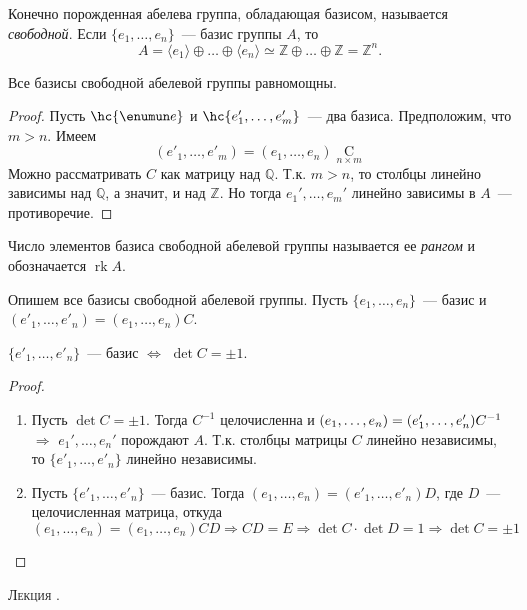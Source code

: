 \documentclass[a4paper]{article}
\newcounter{lec}
\renewcommand{\thelec}{\Roman{lec}}
\newcommand*{\lecture}[1]{\refstepcounter{lec}\vspace{20pt}
\begin{center}{\rmfamily\textsc{Лекция \thelec. \\ \textbf{#1}}}\vspace{5pt}
\end{center}}
\renewcommand{\rk}{\mathop{\mathrm{rk}}\nolimits}
\newcommand*{\p}[1]{#1\nobreak\discretionary{}{\hbox{$\mathsurround=0pt #1$}}{}}
\begin{document}
Конечно порожденная абелева группа, обладающая базисом, называется
\emph{свободной}. Если $\{e_1,\ldots,e_n\}$~--- базис группы $A$, то
$$A=\langle e_1\rangle\oplus\ldots\oplus\langle e_n\rangle\simeq
\mathbb{Z}\oplus\ldots\oplus\mathbb{Z}=\mathbb{Z}^n.$$

\begin{theorem}
Все базисы свободной абелевой группы равномощны.
\end{theorem}

\begin{proof}
Пусть $\hc{\enumun e}$ и $\hc{e'_1,\ldots,e'_m}$~--- два базиса.
Предположим, что $m>n$. Имеем
$$(e'_1,\ldots,e'_m)=(e_1,\ldots,e_n)\mathop{C}\limits_{n\times m}$$
Можно рассматривать $C$ как матрицу над $\mathbb{Q}$. Т.к. $m>n$, то
столбцы линейно зависимы над $\mathbb{Q}$, а значит, и над
$\mathbb{Z}$. Но тогда $e_1',\ldots,e_m'$ линейно зависимы в $A$~---
противоречие.
\end{proof}

Число элементов базиса свободной абелевой группы называется ее
\emph{рангом} и обозначается $\rk A$.

Опишем все базисы свободной абелевой группы. Пусть $\{e_1,\ldots,
e_n\}$~--- базис и $(e'_1,\ldots, e'_n)=(e_1,\ldots,e_n)C$.

\begin{theorem}
$\{e'_1,\ldots, e'_n\}$~--- базис $\Leftrightarrow$ $\det C=\pm1$.
\end{theorem}

\begin{proof}
  \begin{enumerate}
  \item Пусть $\det C=\pm1$. Тогда $C^{-1}$ целочисленна и
    $(e_1,\p\ldots, e_n)=(e'_1,\ldots,e'_n)C^{-1}$ $\Rightarrow$
    $e_1',\ldots,e_n'$ порождают $A$. Т.к. столбцы матрицы $C$ линейно
    независимы, то $\{e'_1,\ldots, e'_n\}$ линейно независимы.

  \item Пусть $\{e'_1,\ldots, e'_n\}$~--- базис. Тогда $(e_1,\ldots,
    e_n)=(e'_1,\ldots,e'_n)D$, где $D$~--- целочисленная матрица, откуда
    \begin{equation*}
      (e_1,\ldots, e_n)=(e_1,\ldots,e_n)CD\Rightarrow
      CD=E \Rightarrow \det C\cdot \det D=1 \Rightarrow \det C=\pm1
    \end{equation*}
  \end{enumerate}
\end{proof}
\lecture{}
\end{document}
